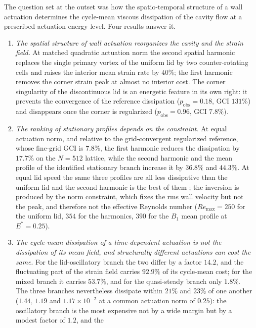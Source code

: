 \documentclass[11pt,a4paper]{article}
\newenvironment{chgadd}{\par\color{blue}}{\par\color{black}}
\begin{document}
\begin{chgadd}
The question set at the outset was how the spatio-temporal structure of a wall
actuation determines the cycle-mean viscous dissipation of the cavity flow at a
prescribed actuation-energy level. Four results answer it.

\begin{enumerate}
\item \emph{The spatial structure of wall actuation reorganizes the cavity and the
strain field.} At matched quadratic actuation norm the second spatial harmonic
replaces the single primary vortex of the uniform lid by two counter-rotating
cells and raises the interior mean strain rate by $40\%$; the first harmonic
removes the corner strain peak at almost no interior cost. The corner singularity
of the discontinuous lid is an energetic feature in its own right: it prevents the
convergence of the reference dissipation ($p_{\mathrm{obs}}=0.18$,
GCI $131\%$) and disappears once the corner is regularized
($p_{\mathrm{obs}}=0.96$, GCI $7.8\%$).
\item \emph{The ranking of stationary profiles depends on the constraint.} At
equal actuation norm, and relative to the grid-convergent regularized reference,
whose fine-grid GCI is $7.8\%$, the first harmonic reduces the dissipation by
$17.7\%$ on the $N=512$ lattice, while the second harmonic
and the mean profile of the identified stationary branch increase it by $36.8\%$
and $44.3\%$. At equal lid speed the same three profiles are all less dissipative
than the uniform lid and the second harmonic is the best of them
\cite{beniaiche2026}; the inversion is produced by the norm constraint, which
fixes the rms wall velocity but not the peak, and therefore not the effective
Reynolds number ($Re_{\max}=250$ for the uniform lid, $354$ for the harmonics,
$390$ for the $B_1$ mean profile at $E^\ast=0.25$).
\item \emph{The cycle-mean dissipation of a time-dependent actuation is not the
dissipation of its mean field, and structurally different actuations can cost the
same.} For the lid-oscillatory branch the two
differ by a factor $14.2$, and the fluctuating part of the strain field carries
$92.9\%$ of its cycle-mean cost; for the mixed branch it carries $53.7\%$, and for
the quasi-steady branch only $1.8\%$. The three branches nevertheless dissipate
within $21\%$ and $23\%$ of one another ($1.44$, $1.19$ and
$1.17\times10^{-2}$ at a common actuation norm of $0.25$): the oscillatory branch
is the most expensive not by a wide margin but by a modest factor of $1.2$, and the

\end{enumerate}
\end{chgadd}
\end{document}
